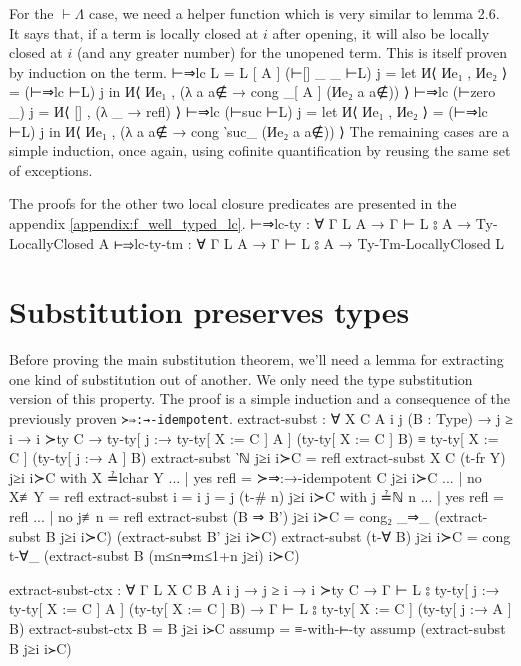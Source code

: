 \documentclass[logo,bsc,singlespacing,parskip,online]{infthesis}
\renewenvironment{code}{\mintedcopy[breaklines,breaksymbolleft=\;]{agda}}{\endmintedcopy}
\begin{document}
For the $\vdash\Lambda$ case, we need a helper function which is very similar to lemma 2.6. It says
that, if a term is locally closed at $i$ after opening, it will also be locally closed at $i$ (and
any greater number) for the unopened term. This is itself proven by induction on the term.
\begin{code}
  ⊢⇒lc {L = L [ A ]} (⊢[] _ _ ⊢L) j =
    let И⟨ Иe₁ , Иe₂ ⟩ = (⊢⇒lc ⊢L) j
    in И⟨ Иe₁ , (λ a {a∉} → cong _[ A ]  (Иe₂ a {a∉})) ⟩
  ⊢⇒lc (⊢zero _) j = И⟨ [] , (λ _ → refl) ⟩
  ⊢⇒lc (⊢suc ⊢L) j = let И⟨ Иe₁ , Иe₂ ⟩ = (⊢⇒lc ⊢L) j
    in И⟨ Иe₁ , (λ a {a∉} → cong ‵suc_ (Иe₂ a {a∉})) ⟩
\end{code}
The remaining cases are a simple induction, once again, using cofinite quantification by reusing the
same set of exceptions.

The proofs for the other two local closure predicates are presented in the appendix \ref{appendix:f_well_typed_lc}.
\begin{code}
  ⊢⇒lc-ty : ∀ {Γ L A} → Γ ⊢ L ⦂ A → Ty-LocallyClosed A
  ⊢⇒lc-ty-tm : ∀ {Γ L A} → Γ ⊢ L ⦂ A → Ty-Tm-LocallyClosed L
\end{code}

\section{Substitution preserves types}
Before proving the main substitution theorem, we'll need a lemma for extracting one kind of
substitution out of another. We only need the type substitution version of this property. The proof
is a simple induction and a consequence of the previously proven \texttt{≻⇒:→-idempotent}.
\begin{code}
  extract-subst : ∀ {X C A i j}
    (B : Type)
    → j ≥ i
    → i ≻ty C
    → ty-ty[ j :→ ty-ty[ X := C ] A ] (ty-ty[ X := C ] B)
        ≡ ty-ty[ X := C ] (ty-ty[ j :→ A ] B)
  extract-subst ‵ℕ j≥i i≻C = refl
  extract-subst {X} {C} (t-fr Y) j≥i i≻C with X ≟lchar Y
  ... | yes refl = ≻⇒:→-idempotent C j≥i i≻C
  ... | no  X≢Y  = refl
  extract-subst {i = i} {j = j} (t-# n) j≥i i≻C with j ≟ℕ n
  ... | yes refl = refl
  ... | no  j≢n  = refl
  extract-subst (B ⇒ B') j≥i i≻C = cong₂ _⇒_
    (extract-subst B j≥i i≻C) (extract-subst B' j≥i i≻C)
  extract-subst (t-∀ B) j≥i i≻C =
    cong t-∀_ (extract-subst B (m≤n⇒m≤1+n j≥i) i≻C)

  extract-subst-ctx : ∀ {Γ L X C B A i j}
    → j ≥ i
    → i ≻ty C
    → Γ ⊢ L ⦂ ty-ty[ j :→ ty-ty[ X := C ] A ] (ty-ty[ X := C ] B)
    → Γ ⊢ L ⦂ ty-ty[ X := C ] (ty-ty[ j :→ A ] B)
  extract-subst-ctx {B = B} j≥i i≻C assump =
    ≡-with-⊢-ty assump (extract-subst B j≥i i≻C)
\end{code}
\end{document}
